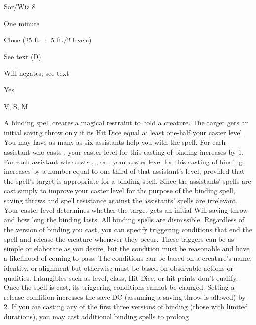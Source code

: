 
\begin{description*}
\item[Level:] Sor/Wiz 8
\item[Casting Time:] One minute
\item[Range:] Close (25 ft. + 5 ft./2 levels)
\item[Duration:] See text (D)
\item[Saving Throw:] Will negates; see text
\item[Spell Resistance:] Yes
\item[Components:] V, S, M
\end{description*}

A binding spell creates a magical restraint to hold a creature. The target
gets an initial saving throw only if its Hit Dice equal at least one-half your
caster level.
You may have as many as six assistants help you with the spell. For each assistant
who casts , your caster level for this casting of binding
increases by 1. For each assistant who casts , , or , your caster level for this casting of binding increases by a number equal to one-third of that assistant's level, provided that
the spell's target is appropriate for a binding spell. Since the assistants'
spells are cast simply to improve your caster level for the purpose of the binding spell, saving throws and spell resistance against the assistants' spells are irrelevant.
Your caster level determines whether the target gets an initial Will saving throw
and how long the binding lasts. All binding spells are dismissible.
Regardless of the version of binding you cast, you can specify triggering
conditions that end the spell and release the creature whenever they occur. These
triggers can be as simple or elaborate as you desire, but the condition must be
reasonable and have a likelihood of coming to pass. The conditions can be based
on a creature's name, identity, or alignment but otherwise must be based on observable
actions or qualities. Intangibles such as level, class, Hit Dice, or hit points
don't qualify. Once the spell is cast, its triggering conditions cannot be changed.
Setting a release condition increases the save DC (assuming a saving throw is allowed)
by 2.
If you are casting any of the first three versions of binding (those with
limited durations), you may cast additional binding spells to prolong

